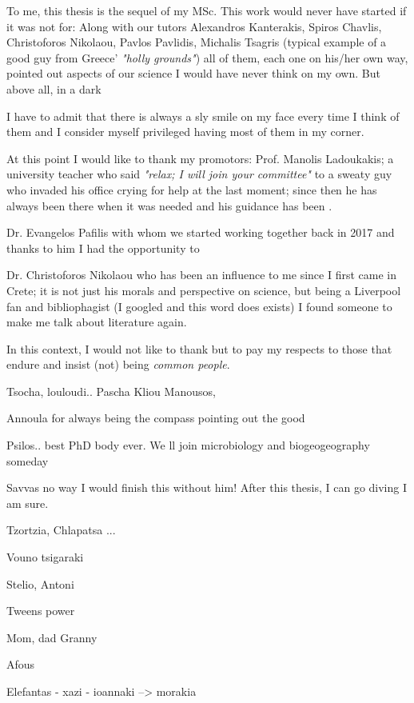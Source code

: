 \documentclass[master=elt, cleveref, autoref, masteroption=eg]{kulemt}
\begin{document}
\begin{preface}
   To me, this thesis is the sequel of my MSc. 
   This work would never have started if it was not for:
   Along with our tutors Alexandros Kanterakis, Spiros Chavlis, 
   Christoforos Nikolaou, 
   Pavlos Pavlidis, 
   Michalis Tsagris (typical example of a 
   good guy from Greece' \textit{"holly grounds"}) 
   all of them, each one on his/her own way, pointed out aspects of our science I would have never think on my own. 
   But above all, in a dark 

   I have to admit that there is always a sly smile on my face every time I think of them 
   and I consider myself privileged having most of them in my corner. 

   At this point I would like to thank my promotors: 
   Prof. Manolis Ladoukakis; a university teacher who said \textit{"relax; I will join your committee"} 
   to a sweaty guy who invaded his office crying for help at the last moment; 
   since then he has always been there when it was needed and his guidance has been . 

   Dr. Evangelos Pafilis with whom we started working together back in 2017 
   and thanks to him I had the opportunity to

   Dr. Christoforos Nikolaou who has been an influence to me since I first came in Crete; 
   it is not just his morals and perspective on science, but being a Liverpool fan and bibliophagist 
   (I googled and this word does exists)
   I found someone to make me talk about literature again. 



   In this context, I would not like to thank but to pay my respects to those that endure 
   and insist (not) being \textit{common people}.

   Tsocha, louloudi.. 
   Pascha 
   Kliou 
   Manousos, 
  
   Annoula for always being the compass pointing out the good 

   Psilos.. best PhD body ever. We ll join microbiology and biogeogeography someday 

   Savvas no way I would finish this without him! After this thesis, I can go diving I am sure. 
   
   Tzortzia, Chlapatsa ... 

   Vouno tsigaraki 

   Stelio, Antoni

   Tweens power 

   Mom, dad 
   Granny 


   Afous 


   Elefantas - xazi - ioannaki --> morakia  
  
\end{preface}
\end{document}
